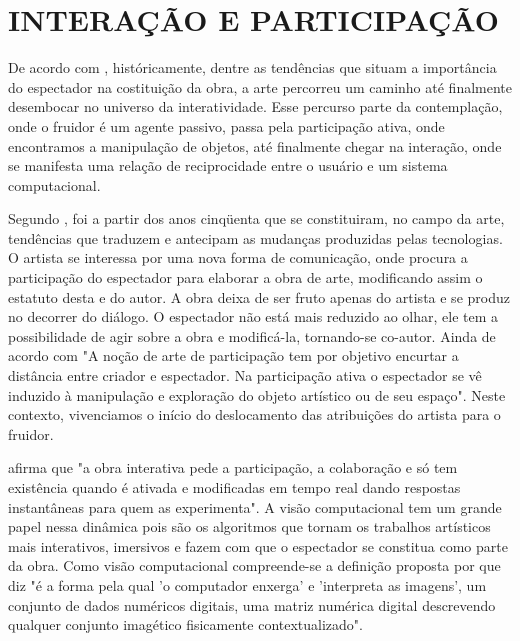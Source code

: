 \chapter{INTERAÇÃO E PARTICIPAÇÃO}

De acordo com , históricamente, dentre as tendências que situam a importância do espectador na costituição da obra, a arte percorreu um caminho até finalmente desembocar no universo da interatividade. Esse percurso parte da contemplação, onde o fruidor é um agente passivo, passa pela participação ativa, onde encontramos a manipulação de objetos, até finalmente chegar na interação, onde se manifesta uma relação de reciprocidade entre o usuário e um sistema computacional.

Segundo , foi a partir dos anos cinqüenta que se constituiram, no campo da arte, tendências que traduzem e antecipam as mudanças produzidas pelas tecnologias. O artista se interessa por uma nova forma de comunicação, onde procura a participação do espectador para elaborar a obra de arte, modificando assim o estatuto desta e do autor. A obra deixa de ser fruto apenas do artista e se produz no decorrer do diálogo. O espectador não está mais reduzido ao olhar, ele tem a possibilidade de agir sobre a obra e modificá-la, tornando-se co-autor. Ainda de acordo com  "A noção de arte de participação tem por objetivo encurtar a distância entre criador e espectador. Na participação ativa o espectador se vê induzido à manipulação e exploração do objeto artístico ou de seu espaço". Neste contexto, vivenciamos o início do deslocamento das atribuições do artista para o fruidor. 

 afirma que "a obra interativa pede a participação, a colaboração e só tem existência quando é ativada e modificadas em tempo real dando respostas instantâneas para quem as experimenta". A visão computacional tem um grande papel nessa dinâmica pois são os algoritmos que tornam os trabalhos artísticos mais interativos, imersivos e fazem com que o espectador se constitua como parte da obra. Como visão computacional compreende-se a definição proposta por  que diz "é a forma pela qual 'o computador enxerga' e 'interpreta as imagens', um conjunto de dados numéricos digitais, uma matriz numérica digital descrevendo qualquer conjunto imagético fisicamente contextualizado".

